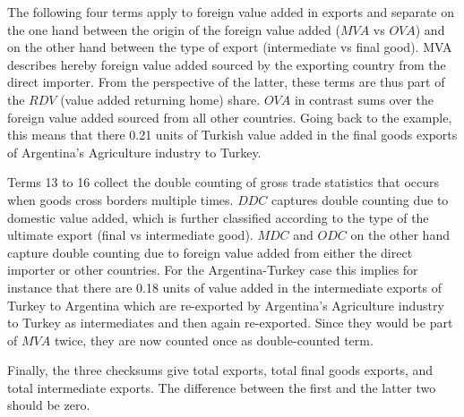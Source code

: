 \documentclass{article}\usepackage[]{graphicx}\usepackage[]{color}
\begin{document}
The following four terms apply to foreign value added in exports and separate on the one hand between the origin of the foreign value added ($MVA$ vs $OVA$) and on the other hand between the type of export (intermediate vs final good). MVA describes hereby foreign value added sourced by the exporting country from the direct importer. From the perspective of the latter, these terms are thus part of the $RDV$ (value added returning home) share. $OVA$ in contrast sums over the foreign value added sourced from all other countries. Going back to the example, this means that there 0.21 units of Turkish value added in the final goods exports of Argentina's Agriculture industry to Turkey.

Terms 13 to 16 collect the double counting of gross trade statistics that occurs when goods cross borders multiple times. $DDC$ captures double counting due to domestic value added, which is further classified according to the type of the ultimate export (final vs intermediate good). $MDC$ and $ODC$ on the other hand capture double counting due to foreign value added from either the direct importer or other countries. For the Argentina-Turkey case this implies for instance that there are 0.18 units of value added in the intermediate exports of Turkey to Argentina which are re-exported by Argentina's Agriculture industry to Turkey as intermediates and then again re-exported. Since they would be part of $MVA$ twice, they are now counted once as double-counted term.

Finally, the three checksums give total exports, total final goods exports, and total intermediate exports. The difference between the first and the latter two should be zero.
\end{document}

